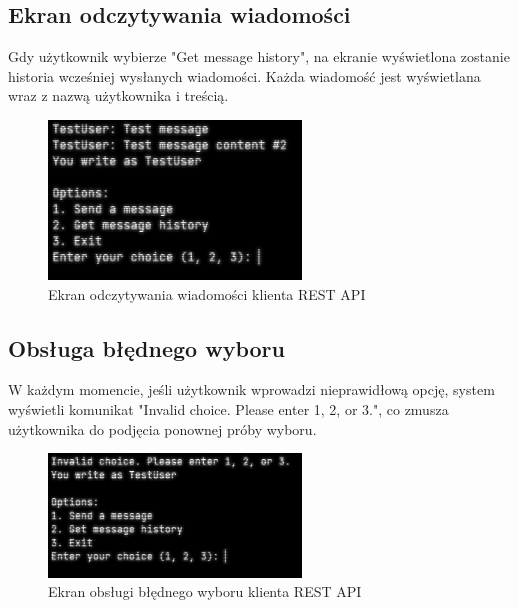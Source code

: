 \subsection{Ekran odczytywania wiadomości}
\begin{spacing}{1.5} %
    Gdy użytkownik wybierze "Get message history", na ekranie wyświetlona zostanie historia wcześniej wysłanych wiadomości. Każda wiadomość jest wyświetlana wraz z nazwą użytkownika i treścią.
    \begin{figure}[ht]
        \centering
        \noindent\hspace*{-2.1cm} %
        \includegraphics[width=0.6\textwidth]{assets/client_get.png}
        \caption{Ekran odczytywania wiadomości klienta REST API}
        \label{fig:client_get}
    \end{figure}
\end{spacing} %

\subsection{Obsługa błędnego wyboru}
\begin{spacing}{1.5} %
    W każdym momencie, jeśli użytkownik wprowadzi nieprawidłową opcję, system wyświetli komunikat "Invalid choice. Please enter 1, 2, or 3.", co zmusza użytkownika do podjęcia ponownej próby wyboru.
    \begin{figure}[ht]
        \centering
        \noindent\hspace*{-2.1cm} %
        \includegraphics[width=0.6\textwidth]{assets/client_invalid_choice.png}
        \caption{Ekran obsługi błędnego wyboru klienta REST API}
        \label{fig:client_invalid_choice}
    \end{figure}
\end{spacing} %

